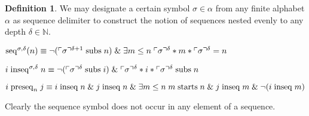 \documentclass{amsbook}
\newcommand{\exis}[1]{\mathord\exists#1\;}
\newcommand{\conj}{\mathrel\&}
\theoremstyle{definition}
\newtheorem{dfn}{Definition}[section]
\begin{document}
\begin{dfn}
    We may designate a certain symbol $\sigma \in \alpha$ from any finite alphabet $\alpha$ as sequence delimiter to construct the notion of sequences nested evenly to any depth $\delta \in \mathbb N$.
    \begin{description}[
            labelindent=\parindent,
            before={
                    \renewcommand\makelabel[1]{(##1).}
                }
        ]
        \item[sequence] $\mathrm{seq}^{\sigma,\delta}(n) \equiv \neg (\ord\sigma^{\delta + 1} \subs n) \conj \exis{m \leq n} \ord\sigma^\delta * m * \ord\sigma^\delta = n$
        \item[occurrence] $i \mathrel\mathrm{inseq}^{\sigma,\delta} n \equiv \neg(\ord\sigma^\delta \subs i) \conj \ord\sigma^\delta * i * \ord\sigma^\delta \subs n$
        \item[precedence] $i \preseq_n j \equiv i \inseq n \conj j \inseq n \conj \exis{m \leq n} m \fuck n \conj j \inseq m \conj \neg(i \inseq m)$
    \end{description}
\end{dfn}

Clearly the sequence symbol does not occur in any element of a sequence.

\newcommand{\base}{\mathrm{base}}
\newcommand{\condition}{\mathrm{condition}}
\newcommand{\final}{\mathrm{final}}
\end{document}
